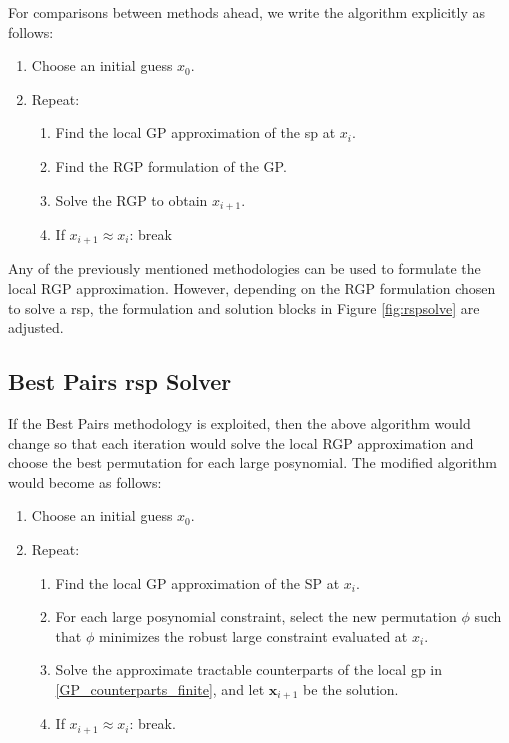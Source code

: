 For comparisons between methods ahead, we write the algorithm explicitly as follows:

\begin{enumerate}
    \item Choose an initial guess $x_0$.
    \item Repeat:
    \begin{enumerate}
        \item Find the local GP approximation of the \gls{sp} at $x_i$.
        \item Find the RGP formulation of the GP.
        \item Solve the RGP to obtain $x_{i+1}$.
        \item If $x_{i+1} \approx x_{i}$: break
    \end{enumerate}
\end{enumerate}

Any of the previously mentioned methodologies can be used to formulate the local RGP approximation. 
However, depending on the RGP formulation chosen to solve a \gls{rsp}, the formulation and solution
blocks in Figure \ref{fig:rspsolve} are adjusted.

\subsection{Best Pairs \gls{rsp} Solver}

If the Best Pairs methodology is exploited, then the above algorithm would change so that
each iteration would solve the local RGP approximation and choose the best permutation
for each large posynomial. The modified algorithm would become as follows:

\begin{enumerate}
    \item Choose an initial guess $x_0$.
    \item Repeat:
    \begin{enumerate}
        \item Find the local GP approximation of the SP at $x_i$.
        \item For each large posynomial constraint, select the new permutation $\phi$
                such that $\phi$ minimizes the robust large constraint evaluated at $x_i$.
        \item Solve the approximate tractable counterparts of the local \gls{gp} in
                \eqref{GP_counterparts_finite}, and let $\mathbf{x}_{i+1}$ be the solution.
        \item If $x_{i+1} \approx x_{i}$: break.
    \end{enumerate}
\end{enumerate}

